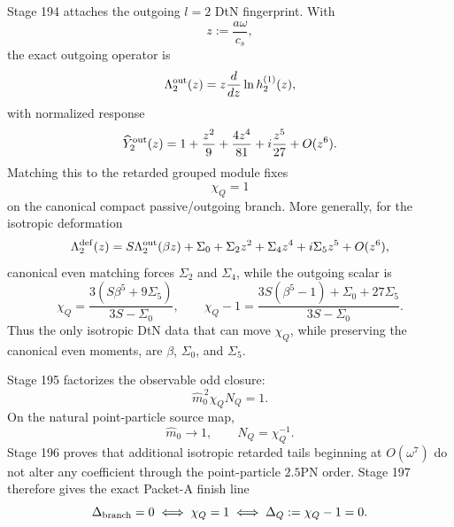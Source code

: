 Stage 194 attaches the outgoing \(l=2\) DtN fingerprint.  With
\begin{equation}
\label{eq:app-part05-z-def}
z:=\frac{a\omega}{c_s},
\end{equation}
the exact outgoing operator is
\begin{equation}
\label{eq:app-part05-Lambda-out}
\Lambda_2^{\rm out}(z)
=
z\frac{d}{dz}\ln h_2^{(1)}(z),
\end{equation}
with normalized response
\begin{equation}
\label{eq:app-part05-Y2-out-fingerprint}
\widehat Y_2^{\rm out}(z)
=
1+\frac{z^2}{9}+\frac{4z^4}{81}+i\frac{z^5}{27}+O(z^6).
\end{equation}
Matching this to the retarded grouped module fixes
\begin{equation}
\label{eq:app-part05-chiQ-canonical}
\chi_Q=1
\end{equation}
on the canonical compact passive/outgoing branch.  More generally, for the isotropic deformation
\begin{equation}
\label{eq:app-part05-DtN-deformation}
\Lambda_2^{\rm def}(z)
=
S\Lambda_2^{\rm out}(\beta z)+\Sigma_0+\Sigma_2z^2+\Sigma_4z^4+i\Sigma_5z^5+O(z^6),
\end{equation}
canonical even matching forces \(\Sigma_2\) and \(\Sigma_4\), while the outgoing scalar is
\begin{equation}
\label{eq:app-part05-chiQ-deformation}
\chi_Q
=
\frac{3(S\beta^5+9\Sigma_5)}{3S-\Sigma_0},
\qquad
\chi_Q-1=
\frac{3S(\beta^5-1)+\Sigma_0+27\Sigma_5}{3S-\Sigma_0}.
\end{equation}
Thus the only isotropic DtN data that can move \(\chi_Q\), while preserving the canonical even moments, are \(\beta\), \(\Sigma_0\), and \(\Sigma_5\).

Stage 195 factorizes the observable odd closure:
\begin{equation}
\label{eq:app-part05-source-outgoing-factorization}
\widehat m_0^{\,2}\chi_QN_Q=1.
\end{equation}
On the natural point-particle source map,
\begin{equation}
\label{eq:app-part05-natural-source-map}
\widehat m_0\to1,
\qquad
N_Q=\chi_Q^{-1}.
\end{equation}
Stage 196 proves that additional isotropic retarded tails beginning at \(O(\omega^7)\) do not alter any coefficient through the point-particle \(2.5\)PN order.  Stage 197 therefore gives the exact Packet-A finish line
\begin{equation}
\label{eq:app-part05-packetA-finish-line}
\Delta_{\rm branch}=0
\iff
\chi_Q=1
\iff
\Delta_Q:=\chi_Q-1=0.
\end{equation}

